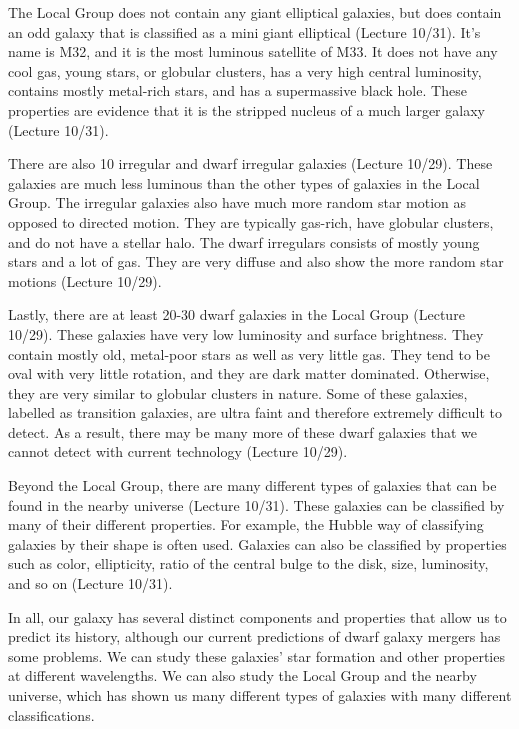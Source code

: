 \documentclass[12pt]{article}
\begin{document}
The Local Group does not contain any giant elliptical galaxies, but does contain
an odd galaxy that is classified as a mini giant elliptical (Lecture 10/31).
It's name is M32,
and it is the most luminous satellite of M33.  It does not have any cool gas,
young stars, or globular clusters, has a very high central luminosity, contains
mostly metal-rich stars, and has a supermassive black hole.  These properties
are evidence that it is the stripped nucleus of a much larger galaxy (Lecture
10/31).

There are also 10 irregular and dwarf irregular galaxies (Lecture 10/29).  These
galaxies are
much less luminous than the other types of galaxies in the Local Group.  The
irregular galaxies also have much more random star motion as opposed to directed
motion.  They are typically gas-rich, have globular clusters, and do not have a
stellar halo.  The dwarf irregulars consists of mostly young stars and a lot of
gas.  They are very diffuse and also show the more random star motions (Lecture
10/29).

Lastly, there are at least 20-30 dwarf galaxies in the Local Group (Lecture
10/29).  These
galaxies have very low luminosity and surface brightness.  They contain mostly
old, metal-poor stars as well as very little gas.  They tend to be oval with
very little rotation, and they are dark matter dominated.  Otherwise, they are
very similar to globular clusters in nature.  Some of these galaxies, labelled
as transition galaxies, are ultra faint and therefore extremely difficult to
detect.  As a result, there may be many more of these dwarf galaxies that we
cannot detect with current technology (Lecture 10/29).

Beyond the Local Group, there are many different types of galaxies that can be
found in the nearby universe (Lecture 10/31).  These galaxies can be classified
by many of their
different properties.  For example, the Hubble way of classifying galaxies by
their shape is often used.  Galaxies can also be classified by properties such
as color, ellipticity, ratio of the central bulge to the disk, size, luminosity,
and so on (Lecture 10/31).

In all, our galaxy has several distinct components and properties that allow us
to predict its history, although our current predictions of dwarf galaxy mergers
has some problems. We can study these galaxies' star formation and other
properties at different wavelengths.  We can also study the Local Group and the
nearby universe, which has shown us many different types of galaxies with many
different classifications.
\end{document}
